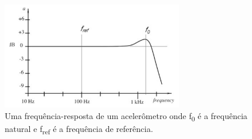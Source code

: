 



\begin{figure}[ht]
    \centering
    \caption{Uma frequência-resposta de um acelerômetro onde f\textsubscript{0} é a frequência natural e f\textsubscript{ref} é a frequência de referência.}
    \begin{center}
        \includegraphics[width=0.7\textwidth]{img/print_grafico_resposta_do_acelerometro.png}
    \end{center}
    \vspace{-0.5cm}
    

    
    \label{fig:grafico_acelerometro}
\end{figure}